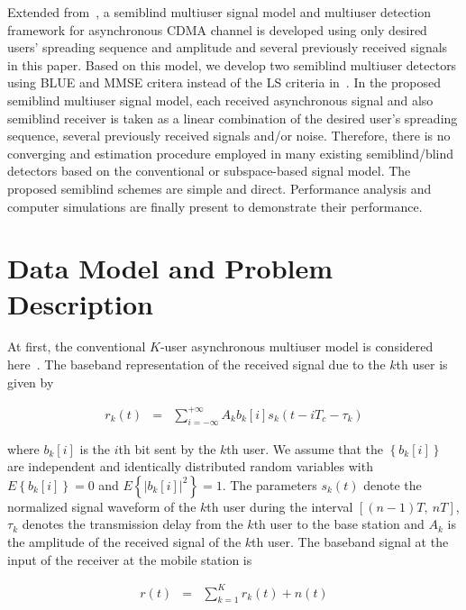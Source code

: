 \documentclass[a4paper,10pt,fleqn, twocolumn]{IEEETran}
\begin{document}
Extended from~\cite{Wang03d,Wang03e}, a semiblind multiuser signal
model and multiuser detection framework for asynchronous CDMA
channel is developed using only desired users' spreading sequence
and amplitude and several previously received signals in this
paper. Based on this model, we develop two semiblind multiuser
detectors using BLUE and MMSE critera instead of the LS criteria
in~\cite{Wang03d,Wang03e}. In the proposed semiblind multiuser
signal model, each received asynchronous signal and also semiblind
receiver is taken as a linear combination of the desired user's
spreading sequence, several previously received signals and/or
noise. Therefore, there is no converging and estimation procedure
employed in many existing semiblind/blind detectors based on the
conventional or subspace-based signal model. The proposed
semiblind schemes are simple and direct. Performance analysis and
computer simulations are finally present to demonstrate their
performance.

\section{Data Model and Problem Description}
At first, the conventional $K$-user asynchronous multiuser model
is considered here~\cite{Verd98}. The baseband representation of
the received signal due to the $k$th user is given by

\begin{equation}
\begin{array}{rcl}
r_k(t)&=&\sum\limits_{i=-\infty}^{+\infty}A_k b_k[i]
s_k(t-iT_c-\tau_k)
\end{array}
\end{equation}

\noindent where $b_k[i]$ is the $i$th bit sent by the $k$th user.
We assume that the $\left\{b_k[i]\right\}$ are independent and
identically distributed random variables with
$E\left\{b_k[i]\right\}=0$ and $E\left\{|b_k[i]|^2\right\}=1$. The
parameters $s_k(t)$ denote the normalized signal waveform of the
$k$th user during the interval $[(n-1)T,\ nT]$, $\tau_k$ denotes
the transmission delay from the $k$th user to the base station and
$A_k$ is the amplitude of the received signal of the $k$th user.
The baseband signal at the input of the receiver at the mobile
station is

\begin{equation}
\begin{array}{rcl}
r(t)&=&\sum\limits_{k=1}^{K}r_k(t)+n(t)
\end{array}
\end{equation}
\end{document}
